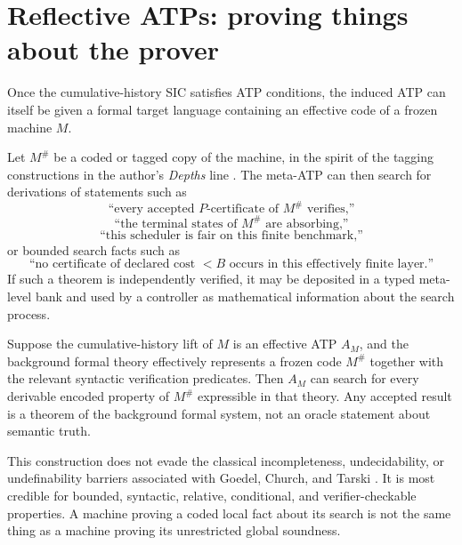 \section{Reflective ATPs: proving things about the prover}
Once the cumulative-history SIC satisfies ATP conditions, the induced ATP can itself be given a formal target language containing an effective code of a frozen machine $M$.

Let $M^{\#}$ be a coded or tagged copy of the machine, in the spirit of the tagging constructions in the author's \emph{Depths} line \cite{depths}. The meta-ATP can then search for derivations of statements such as
\[
\text{``every accepted $P$-certificate of $M^{\#}$ verifies,''}
\]
\[
\text{``the terminal states of $M^{\#}$ are absorbing,''}
\]
\[
\text{``this scheduler is fair on this finite benchmark,''}
\]
or bounded search facts such as
\[
\text{``no certificate of declared cost $<B$ occurs in this effectively finite layer.''}
\]
If such a theorem is independently verified, it may be deposited in a typed meta-level bank and used by a controller as mathematical information about the search process.

\begin{theorem}
Suppose the cumulative-history lift of $M$ is an effective ATP $A_M$, and the background formal theory effectively represents a frozen code $M^{\#}$ together with the relevant syntactic verification predicates. Then $A_M$ can search for every derivable encoded property of $M^{\#}$ expressible in that theory. Any accepted result is a theorem of the background formal system, not an oracle statement about semantic truth.
\end{theorem}

\begin{caution}
This construction does not evade the classical incompleteness, undecidability, or undefinability barriers associated with Goedel, Church, and Tarski \cite{godel,church,tarski}. It is most credible for bounded, syntactic, relative, conditional, and verifier-checkable properties. A machine proving a coded local fact about its search is not the same thing as a machine proving its unrestricted global soundness.
\end{caution}
